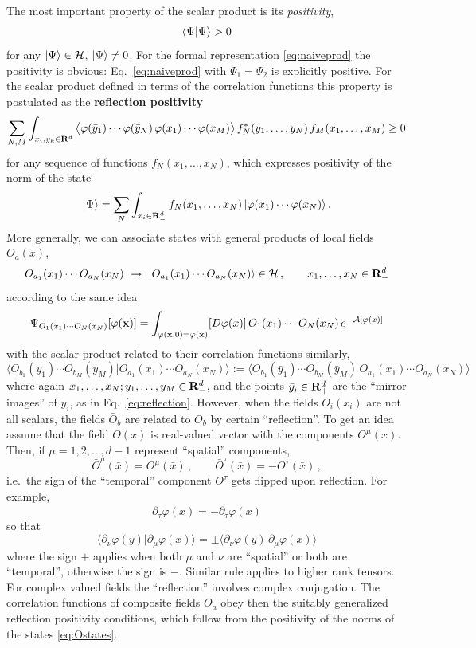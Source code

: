 The most important property of the scalar product is its \emph{positivity},
\[
\langle \Psi|\Psi\rangle>0
\]
for any $|\Psi\rangle\in\mathcal{H}$, $|\Psi\rangle\neq0$. For the formal representation
\eqref{eq:naiveprod} the positivity is obvious: Eq.~\eqref{eq:naiveprod} with
$\Psi_1=\Psi_2$ is explicitly positive. For the scalar product defined in terms of
the correlation functions this property is postulated as the \textbf{reflection
positivity}
\[
\sum_{N,M}\int_{x_i,y_k\in\mathbf{R}^d_-}\bigl\langle\varphi(\bar y_1)\cdots\varphi(\bar y_N)\,\varphi(x_1)\cdots\varphi(x_M)\bigr\rangle\,f_N^*(y_1,\dots,y_N)\,f_M(x_1,\dots,x_M)\ge0
\]
for any sequence of functions $f_N(x_1,\dots,x_N)$, which expresses positivity of the
norm of the state
\[
|\Psi\rangle=\sum_N\int_{x_i\in\mathbf{R}^d_-}f_N(x_1,\dots,x_N)\,|\varphi(x_1)\cdots\varphi(x_N)\rangle\,.
\]
More generally, we can associate states with general products of local fields
$O_a(x)$,
\begin{equation}\label{eq:Ostates}
O_{a_1}(x_1)\cdots O_{a_N}(x_N)\ \to\ |O_{a_1}(x_1)\cdots O_{a_N}(x_N)\rangle\in\mathcal{H}\,,\qquad x_1,\dots,x_N\in\mathbf{R}^d_-
\end{equation}
according to the same idea
\[
\Psi_{O_1(x_1)\cdots O_N(x_N)}[\varphi(\mathbf{x})]=\int_{\varphi(\mathbf{x},0)=\varphi(\mathbf{x})}[D\varphi(x)]\,O_1(x_1)\cdots O_N(x_N)\,e^{-\mathcal A[\varphi(x)]}
\]
with the scalar product related to their correlation functions similarly,
\[
\bigl\langle O_{b_1}(y_1)\cdots O_{b_M}(y_M)\big|O_{a_1}(x_1)\cdots O_{a_N}(x_N)\bigr\rangle
:=\bigl\langle\bar O_{b_1}(\bar y_1)\cdots\bar O_{b_M}(\bar y_M)\,O_{a_1}(x_1)\cdots O_{a_N}(x_N)\bigr\rangle
\]
where again $x_1,\dots,x_N;y_1,\dots,y_M\in\mathbf{R}^d_-$, and the points
$\bar y_i\in\mathbf{R}^d_+$ are the ``mirror images'' of $y_i$, as in
Eq.~\eqref{eq:reflection}. However, when the fields $O_i(x_i)$ are not all scalars,
the fields $\bar O_b$ are related to $O_b$ by certain ``reflection''. To get an idea
assume that the field $O(x)$ is real-valued vector with the components $O^\mu(x)$.
Then, if $\mu=1,2,\dots,d-1$ represent ``spatial'' components,
\[
\bar O^\mu(\bar x)=O^\mu(\bar x)\,,\qquad\bar O^\tau(\bar x)=-O^\tau(\bar x)\,,
\]
i.e.\ the sign of the ``temporal'' component $O^\tau$ gets flipped upon reflection.
For example,
\[
\overline{\partial_\tau\varphi}(x)=-\partial_\tau\varphi(x)
\]
so that
\[
\bigl\langle\partial_\nu\varphi(y)\big|\partial_\mu\varphi(x)\bigr\rangle=\pm\bigl\langle\partial_\nu\varphi(\bar y)\,\partial_\mu\varphi(x)\bigr\rangle
\]
where the sign $+$ applies when both $\mu$ and $\nu$ are ``spatial'' or both are
``temporal'', otherwise the sign is $-$. Similar rule applies to higher rank tensors.
For complex valued fields the ``reflection'' involves complex conjugation. The
correlation functions of composite fields $O_a$ obey then the suitably generalized
reflection positivity conditions, which follow from the positivity of the norms of
the states \eqref{eq:Ostates}.

